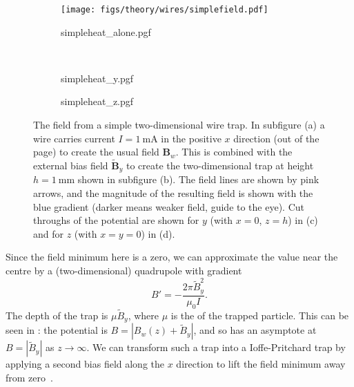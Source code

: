 \begin{figure}[htbp]
  \centering
  \begin{subfigure}[b]{0.45\textwidth}
    \centering
    \hfill{}
    \texttt{[image: figs/theory/wires/simplefield.pdf]}
    \hfill{}
  \end{subfigure}
  \begin{subfigure}[b]{0.45\textwidth}
    \centering
    {simpleheat_alone.pgf}
  \end{subfigure} \\
  \begin{subfigure}[b]{0.45\textwidth}
    \centering
    {simpleheat_y.pgf}
  \end{subfigure}
  \begin{subfigure}[b]{0.45\textwidth}
    \centering
    {simpleheat_z.pgf}
  \end{subfigure}
  \caption{
    The field from a simple two-dimensional wire trap. In subfigure (a) a wire carries
    current $I=\SI{1}{\milli\ampere}$ in the positive $x$ direction (out of the
    page) to create the usual field $\mathbf{B}_w$. This is combined with the
    external bias field $\mathbf{\tilde{B}}_y$ to create the two-dimensional trap
    at height $h=\SI{1}{\milli\meter}$
    shown in subfigure (b). The field lines are shown by pink arrows, and the
    magnitude of the resulting field is shown with the blue gradient (darker
    means weaker field, guide to the eye). Cut throughs of the potential are
    shown for $y$ (with $x=0$, $z=h$) in (c) and for $z$ (with $x = y = 0$) in
    (d).
  }
  \label{theory:fig:simplefield}
\end{figure}

Since the field minimum here is a zero, we can approximate the value near the
centre by a (two-dimensional) quadrupole with gradient
%
\begin{equation}
  B' = -\frac{2\pi \tilde{B}_y^2}{\mu_0 I}.
\end{equation}
%
The depth of the trap is $\mu \tilde{B}_y$, where $\mu$ is the  of the trapped particle. This can be seen in
: the potential is $B = |B_w(z) +
\tilde{B}_y|$, and so has an asymptote at $B=|\tilde{B}_y|$ as
$z\rightarrow\infty$.
%
We can transform such a trap into a Ioffe-Pritchard trap by applying a second
bias field along the $x$ direction to lift the field minimum away from
zero~\cite{2011Ac}.

